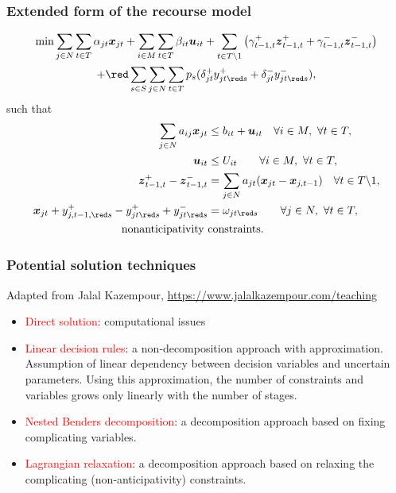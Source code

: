 \documentclass{beamer}
\def\bx{\boldsymbol{x}}
\def\bu{\boldsymbol{u}}
\def\bz{\boldsymbol{z}}
\begin{document}
\begin{frame}
\frametitle{Extended form of the recourse model}

\begin{multline*}
\min \sum_{j \in N} \sum_{t \in T} \alpha_{jt} \bx_{jt} + \sum_{i \in M}
\sum_{t \in T} \beta_{it} \bu_{it} + \sum_{t \in T\backslash 1} \left(
  \gamma^+_{t-1,t} \bz^+_{t-1,t} + \gamma^-_{t-1,t} \bz^-_{t-1,t} \right) \\
+ {\red \sum_{s \in S}}\sum_{j \in N} \sum_{t \in T} p_s
    ( \delta_{jt}^+y_{jt{\red s}}^+ + \delta_{jt}^-y_{jt{\red s}}^- ),
\end{multline*}
such that
\begin{align*}
\sum_{j \in N} a_{ij} \bx_{jt} & \leq b_{it}+\bu_{it} \quad \forall i \in
M,\ \forall t \in T,\\
\bu_{it} & \leq U_{it} \qquad \forall i \in M,\ \forall t \in T,\\
\bz^+_{t-1,t} - \bz^-_{t-1,t} &= \sum_{j \in N} a_{jt}(\bx_{jt} - \bx_{j,
  t-1}) \quad \forall t \in T\backslash 1, \\
\bx_{jt} + y_{j,t-1,{\red s}}^+ - y_{jt{\red s}}^+ + y_{jt{\red s}}^- &= \omega_{jt{\red s}} \qquad
\forall j \in N,\ \forall t \in T,\\
\mbox{nonanticipativity }& \mbox{constraints}.
\end{align*}
\end{frame}

\begin{frame}
\frametitle{Potential solution techniques}

Adapted from Jalal Kazempour, \url{https://www.jalalkazempour.com/teaching}

\begin{itemize}
\item 
\textcolor{red}{Direct solution}:
computational issues
\item 
\textcolor{red}{Linear decision rules}: 
a non‐decomposition approach with approximation.
Assumption of linear dependency between decision variables and uncertain
parameters. Using this approximation, the number of constraints and variables grows
only linearly with the number of stages.
\item 
\textcolor{red}{Nested Benders decomposition}: a decomposition approach based on fixing complicating variables.
\item 
\textcolor{red}{Lagrangian relaxation}: a decomposition approach based on relaxing the complicating (non‐anticipativity) constraints.
\end{itemize}

\end{frame}
\end{document}
